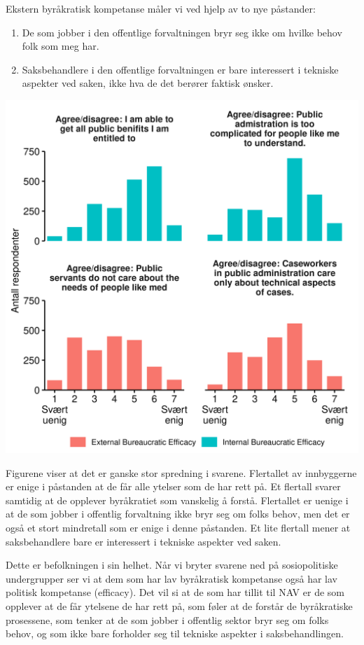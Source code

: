 \documentclass[
]{book}
\begin{document}
Ekstern byråkratisk kompetanse måler vi ved hjelp av to nye påstander:

\begin{enumerate}
\def\labelenumi{\arabic{enumi}.}
\item
  De som jobber i den offentlige forvaltningen bryr seg ikke om hvilke behov folk som meg har.
\item
  Saksbehandlere i den offentlige forvaltningen er bare interessert i tekniske aspekter ved saken, ikke hva de det berører faktisk ønsker.
\end{enumerate}

\includegraphics{figs/png/fig_be_hist.png}

Figurene viser at det er ganske stor spredning i svarene.
Flertallet av innbyggerne er enige i påstanden at de får alle ytelser som de har rett på.
Et flertall svarer samtidig at de opplever byråkratiet som vanskelig å forstå.
Flertallet er uenige i at de som jobber i offentlig forvaltning ikke bryr seg om folks behov, men det er også et stort mindretall som er enige i denne påstanden.
Et lite flertall mener at saksbehandlere bare er interessert i tekniske aspekter ved saken.

Dette er befolkningen i sin helhet.
Når vi bryter svarene ned på sosiopolitiske undergrupper ser vi at dem som har lav byråkratisk kompetanse også har lav politisk kompetanse (efficacy).
Det vil si at de som har tillit til NAV er de som opplever at de får ytelsene de har rett på, som føler at de forstår de byråkratiske prosessene, som tenker at de som jobber i offentlig sektor bryr seg om folks behov, og som ikke bare forholder seg til tekniske aspekter i saksbehandlingen.
\end{document}
